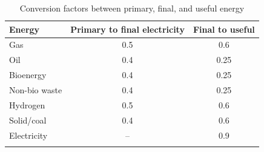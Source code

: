 \begin{longtable}{lcc}
\caption{Conversion factors between primary, final, and useful energy} \\ 
  \hline
Energy & Primary to final electricity & Final to useful \\ 
  \hline
Gas & 0.5 & 0.6 \\ 
  Oil & 0.4 & 0.25 \\ 
  Bioenergy & 0.4 & 0.25 \\ 
  Non-bio waste & 0.4 & 0.25 \\ 
  Hydrogen & 0.5 & 0.6 \\ 
  Solid/coal & 0.4 & 0.6 \\ 
  Electricity & -- & 0.9 \\ 
   \hline
\hline
\label{tab_conversion_factor_energy}
\end{longtable}
